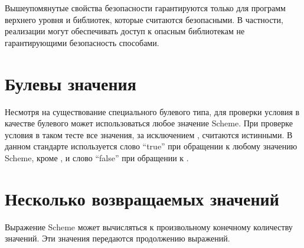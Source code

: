 Вышеупомянутые свойства безопасности гарантируются только для программ верхнего уровня и
библиотек, которые считаются безопасными. В частности, реализации могут обеспечивать
доступ к опасным библиотекам не гарантирующими безопасность способами.\vspace{-2mm}

\section{Булевы значения}\vspace{-1mm}
\label{booleanvaluessection}

Несмотря на существование специального булевого типа, для проверки условия в качестве булевого
может использоваться любое значение Scheme. При проверке условия в таком тесте все значения,
за исключением {\bfseries\schfalse{}}, считаются истинными. В данном стандарте используется
слово ``true'' при обращении к любому значению Scheme, кроме {\bfseries\schfalse{}}, и слово
``false'' при обращении к {\bfseries\schfalse{}}. \vspace{-2mm}

\section{Несколько возвращаемых значений}\vspace{-1mm}
\label{multiplereturnvaluessection}

Выражение Scheme может вычисляться к произвольному конечному количеству значений. Эти значения
передаются продолжению выражений.


